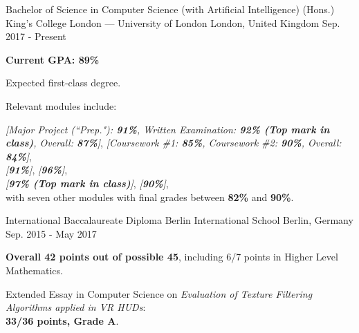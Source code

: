 

\begin{cventries}

    \cventry
    {Bachelor of Science in Computer Science (with Artificial Intelligence) (Hons.)} %
    {King’s College London --- University of London} %
    {London, United Kingdom} %
    {Sep. 2017 - Present} %
    {
        \begin{cvitems} %
            \item {\textbf{Current GPA: 89\%}}
            \item {Expected first-class degree.}
            \item {Relevant modules include:}
            \begin{flushleft}
                 \textit{[Major Project (``Prep."): \textbf{91\%}, Written Examination: \textbf{92\% (Top mark in class)}, Overall: \textbf{87\%}]},
                 \textit{[Coursework \#1: \textbf{85\%}, Coursework \#2: \textbf{90\%}, Overall: \textbf{84\%}]},\\
                 \textit{[\textbf{91\%}]},  \textit{[\textbf{96\%}]},\\
                 \textit{[\textbf{97\% (Top mark in class)}]},  \textit{[\textbf{90\%}]},\\
                with seven other modules with final grades between \textbf{82\%} and \textbf{90\%}.
            \end{flushleft}
        \end{cvitems}
    }

    \cventry
    {International Baccalaureate Diploma} %
    {Berlin International School} %
    {Berlin, Germany} %
    {Sep. 2015 - May 2017} %
    {
        \begin{cvitems} %
            \item {\textbf{Overall 42 points out of possible 45}, including 6/7 points in Higher Level Mathematics.}
            \item {Extended Essay in Computer Science on \textit{Evaluation of Texture Filtering Algorithms applied in VR HUDs}:\\
            \textbf{33/36 points, Grade A}.}
        \end{cvitems}
    }


\end{cventries}
